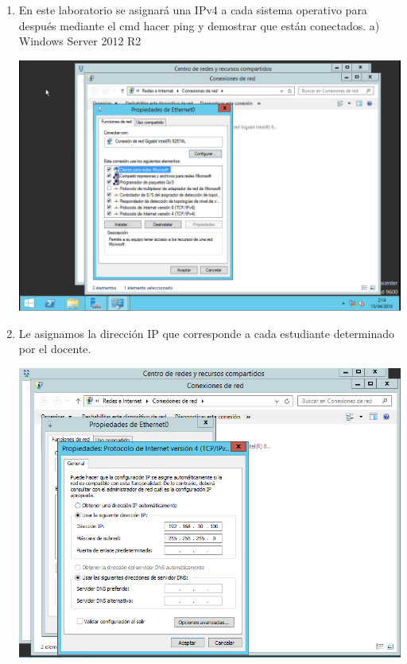 \begin{enumerate}[1.]
	\item En este laboratorio se asignará una IPv4 a cada sistema operativo para después mediante el cmd hacer ping y demostrar que están conectados.
	\subitem a)	Windows Server 2012 R2

	\begin{center}
	\includegraphics[width=15cm]{./Imagenes/img10server} 
	\end{center}
	
	\item Le asignamos la dirección IP que corresponde a cada estudiante determinado por el docente.

	\begin{center}
	\includegraphics[width=15cm]{./Imagenes/img11server} 
	\end{center}


								

	

\end{enumerate} 
